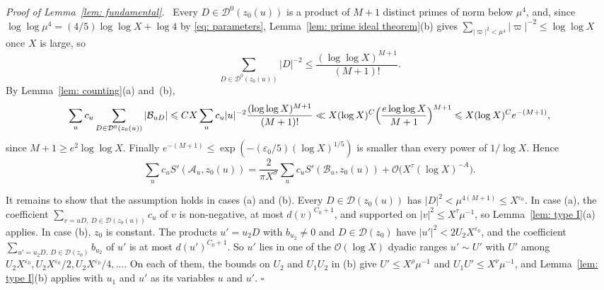 \documentclass{article}
\numberwithin{equation}{section}
\newenvironment{proof}[1][Proof]{\par\medskip\noindent\textit{#1.}\ }{\hfill$\square$\par\medskip}
\newcommand{\Le}{\leqslant}
\newcommand{\Ge}{\geqslant}
\begin{document}
\begin{proof}[Proof of Lemma~\ref{lem: fundamental}]
Every $D \in \mathcal{D}^0(z_0(u))$ is a product of $M + 1$ distinct primes of norm below $\mu^4$, and, since $\log\log \mu^4 = (4/5) \log\log X + \log 4$ by \eqref{eq: parameters}, Lemma~\ref{lem: prime ideal theorem}(b) gives $\sum_{|\varpi|^2 < \mu^4} |\varpi|^{-2} \Le \log\log X$ once $X$ is large, so
\begin{equation*}
\sum_{D \in \mathcal{D}^0(z_0(u))} |D|^{-2} \Le \frac{(\log\log X)^{M+1}}{(M+1)!}.
\end{equation*} By Lemma~\ref{lem: counting}(a) and~(b),
\begin{equation*}
\sum_u c_u \sum_{D \in \mathcal{D}^0(z_0(u))} |\mathcal{B}_{uD}| \Le C X \sum_u c_u |u|^{-2} \frac{(\log\log X)^{M+1}}{(M+1)!} \ll X (\log X)^C \Bigl( \frac{e \log\log X}{M + 1} \Bigr)^{M+1} \Le X (\log X)^C e^{-(M+1)},
\end{equation*}
since $M + 1 \Ge e^2 \log\log X$. Finally $e^{-(M+1)} \Le \exp(-(\varepsilon_0/5)(\log X)^{1/5})$ is smaller than every power of $1/\log X$. Hence
\begin{equation*}
\sum_u c_u S'(\mathcal{A}_u, z_0(u)) = \frac{2}{\pi X^{\sigma}} \sum_u c_u S'(\mathcal{B}_u, z_0(u)) + \mathcal{O}\bigl(X^{\tau}(\log X)^{-A}\bigr).
\end{equation*}

It remains to show that the assumption holds in cases (a) and (b). Every $D \in \mathcal{D}(z_0(u))$ has $|D|^2 < \mu^{4(M+1)} \Le X^{\varepsilon_0}$. In case (a), the coefficient $\sum_{v = uD,\ D \in \mathcal{D}(z_0(u))} c_u$ of $v$ is non-negative, at most $d(v)^{C_0 + 1}$, and supported on $|v|^2 \Le X^{\tau} \mu^{-1}$, so Lemma~\ref{lem: type I}(a) applies. In case (b), $z_0$ is constant. The products $u' = u_2 D$ with $b_{u_2} \neq 0$ and $D \in \mathcal{D}(z_0)$ have $|u'|^2 < 2U_2 X^{\varepsilon_0}$, and the coefficient $\sum_{u' = u_2 D,\ D \in \mathcal{D}(z_0)} b_{u_2}$ of $u'$ is at most $d(u')^{C_0 + 1}$. So $u'$ lies in one of the $\mathcal{O}(\log X)$ dyadic ranges $u' \sim U'$ with $U'$ among $U_2 X^{\varepsilon_0}, U_2 X^{\varepsilon_0}/2, U_2 X^{\varepsilon_0}/4, \dots$. On each of them, the bounds on $U_2$ and $U_1 U_2$ in (b) give $U' \Le X^{\rho} \mu^{-1}$ and $U_1 U' \Le X^{\nu} \mu^{-1}$, and Lemma~\ref{lem: type I}(b) applies with $u_1$ and $u'$ as its variables $u$ and $u'$.
\end{proof}
\end{document}
